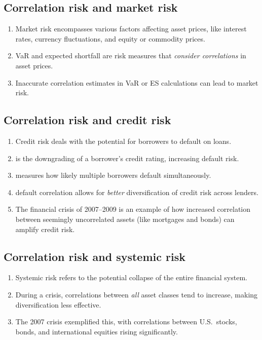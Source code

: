 \subsection{Correlation risk and market risk}
\begin{enumerate}[label=\textbf{\alph*)}]
\item Market risk encompasses various factors affecting asset prices, like interest rates,
      currency fluctuations, and equity or commodity prices.
\item VaR and expected shortfall are risk measures that \textit{consider correlations} in asset
      prices.
\item Inaccurate correlation estimates in VaR or ES calculations can lead to
       market risk.
\end{enumerate}

\subsection{Correlation risk and credit risk}
\begin{enumerate}[label=\textbf{\alph*)}]
\item Credit risk deals with the potential for borrowers to default on loans.
\item {} is the downgrading of a borrower's credit rating, increasing default
      risk.
\item {} measures how likely multiple borrowers default simultaneously.
\item {} default correlation allows for \textit{better} diversification of credit risk
      across lenders.
\item The financial crisis of 2007--2009 is an example of how increased correlation between
      seemingly uncorrelated assets (like mortgages and bonds) can amplify credit risk.
\end{enumerate}


\subsection{Correlation risk and systemic risk}
\begin{enumerate}[label=\textbf{\alph*)}]
\item Systemic risk refers to the potential collapse of the entire financial system.
\item During a crisis, correlations between \textit{all} asset classes tend to increase, making
      diversification less effective.
\item The 2007 crisis exemplified this, with correlations between U.S.\ stocks, bonds, and
      international equities rising significantly.
\end{enumerate}

